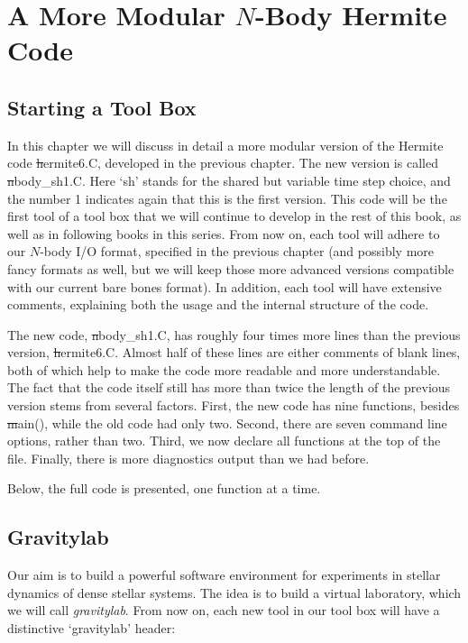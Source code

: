 \chapter{A More Modular $N$-Body Hermite Code}

\section{Starting a Tool Box}

In this chapter we will discuss in detail a more modular version of
the Hermite code {\st hermite6.C}, developed in the previous chapter.
The new version is called {\st nbody\_sh1.C}.  Here `sh' stands for the
shared but variable time step choice, and the number 1 indicates again
that this is the first version.  This code will be the first tool of a
tool box that we will continue to develop in the rest of this book, as
well as in following books in this series.  From now on, each tool
will adhere to our $N$-body I/O format, specified in the previous
chapter (and possibly more fancy formats as well, but we will keep
those more advanced versions compatible with our current bare bones
format).  In addition, each tool will have extensive comments,
explaining both the usage and the internal structure of the code.

The new code, {\st nbody\_sh1.C}, has roughly four times more lines
than the previous version, {\st hermite6.C}.  Almost half of these
lines are either comments of blank lines, both of which help to make
the code more readable and more understandable.  The fact that the
code itself still has more than twice the length of the previous
version stems from several factors.  First, the new code has nine
functions, besides {\st main()}, while the old code had only two.
Second, there are seven command line options, rather than two.
Third, we now declare all functions at the top of the file.
Finally, there is more diagnostics output than we had before.

Below, the full code is presented, one function at a time.

\section{Gravitylab}

Our aim is to build a powerful software environment for experiments
in stellar dynamics of dense stellar systems.  The idea is to build
a virtual laboratory, which we will call {\it gravitylab}.  
From now on, each new tool in our tool box will have a distinctive
`gravitylab' header:

